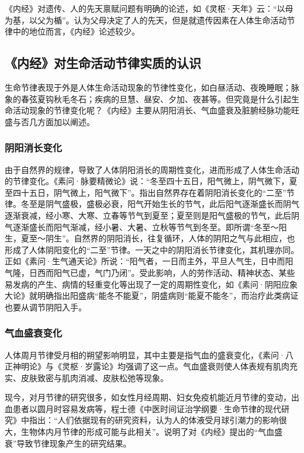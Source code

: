 \documentclass[draft,12pt]{ctexbook}
\begin{document}
《内经》对遗传、人的先天禀赋问题有明确的论述，如《灵枢·天年》云：“以母为基，以父为楯”。认为父母决定了人的先天，但是就遗传因素在人体生命活动节律中的地位而言，《内经》论述较少。

\subsection{《内经》对生命活动节律实质的认识}%

生命节律表现于外是人体生命活动现象的节律性变化，如白昼活动、夜晚睡眠；脉象的春弦夏钩秋毛冬石；疾病的旦慧、昼安、夕加、夜甚等。但究竟是什么引起生命活动现象的节律变化呢？《内经》主要从阴阳消长、气血盛衰及脏腑经脉功能旺盛与否几方面加以阐述。

\subsubsection{阴阳消长变化}%

由于自然界的规律，导致了人体阴阳消长的周期性变化，进而形成了人体生命活动的节律变化。《素问·脉要精微论》说：“冬至四十五日，阳气微上，阴气微下，夏至四十五日，阴气微上，阳气微下”。指出自然界存在着阴阳消长变化的“二至”节律。冬至是阴气盛极，盛极必衰，阳气开始生长的节气，此后阳气逐渐盛长而阴气逐渐衰减，经小寒、大寒、立春等节气到夏至；夏至则是阳气盛极的节气，此后阴气逐渐盛长而阳气渐减，经小暑、大暑、立秋等节气到冬至。即所谓“冬至〜阳生，夏至〜阴生”。自然界的阴阳消长，往复循环，人体的阴阳之气与此相应，也形成了人体阴阳变化的“二至”节律。一天之中的阴阳消长节律变化，其机理亦同。正如《素问·生气通天论》所说：“阳气者，一日而主外，平旦人气生，日中而阳气隆，日西而阳气已虚，气门乃闭”。受此影响，人的劳作活动、精神状态、某些易发病的产生、病情的轻重变化等出现了一定的周期性变化，如《素问·阴阳应象大论》就明确指出阳盛病“能冬不能夏”，阴盛病则“能夏不能冬”，而治疗此类病证也要从调节阴阳入手。

\subsubsection{气血盛衰变化}%

人体周月节律受月相的朔望影响明显，其中主要是指气血的盛衰变化，《素问·八正神明论》与《灵枢·岁露论》均强调了这一点。气血盛衰则使人体表规有肌肉充实、皮肤致密与肌肉消减、皮肤松弛等现象。

现今，对月节律的研究很多，如女性月经周期、妇女免疫机能近月节律的变动，出血患者以圆月时容易发病等，程士德《中医时间证治学纲要·生命节律的现代研究》中指出：“人们依据现有的研究资料，认为人的体液受月球引潮力的影响很大，生物体内月节律的形成可能与此相关”。说明了对《内经》提出的“气血盛衰”导致节律现象产生的研究结果。
\end{document}
